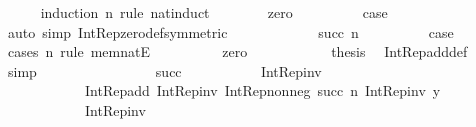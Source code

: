 \begin{isabellebody}
\ \ \ \ \isamarkupfalse%
\ {\isacharparenleft}{\kern0pt}induction\ n\ rule{\isacharcolon}{\kern0pt}\ nat{\isacharunderscore}{\kern0pt}induct{\isacharparenright}{\kern0pt}\isanewline
\ \ \ \ \ \ \isamarkupfalse%
\ zero\isanewline
\ \ \ \ \ \ \isamarkupfalse%
\ \isamarkupfalse%
\ {\isacharquery}{\kern0pt}case\ \isamarkupfalse%
\ {\isacharparenleft}{\kern0pt}auto\ simp{\isacharcolon}{\kern0pt}\ Int{\isacharunderscore}{\kern0pt}Rep{\isacharunderscore}{\kern0pt}zero{\isacharunderscore}{\kern0pt}def{\isacharbrackleft}{\kern0pt}symmetric{\isacharbrackright}{\kern0pt}{\isacharparenright}{\kern0pt}\isanewline
\ \ \ \ \isamarkupfalse%
\isanewline
\ \ \ \ \ \ \isamarkupfalse%
\ {\isacharparenleft}{\kern0pt}succ\ n{\isacharparenright}{\kern0pt}\isanewline
\ \ \ \ \ \ \isamarkupfalse%
\ \isamarkupfalse%
\ {\isacharquery}{\kern0pt}case\isanewline
\ \ \ \ \ \ \isamarkupfalse%
\ {\isacharparenleft}{\kern0pt}cases\ n\ rule{\isacharcolon}{\kern0pt}\ mem{\isacharunderscore}{\kern0pt}natE{\isacharparenright}{\kern0pt}\isanewline
\ \ \ \ \ \ \ \ \isamarkupfalse%
\ zero\isanewline
\ \ \ \ \ \ \ \ \isamarkupfalse%
\ \isamarkupfalse%
\ {\isacharquery}{\kern0pt}thesis\ \isamarkupfalse%
\ Int{\isacharunderscore}{\kern0pt}Rep{\isacharunderscore}{\kern0pt}add{\isacharunderscore}{\kern0pt}def\ \isamarkupfalse%
\ simp\isanewline
\ \ \ \ \ \ \isamarkupfalse%
\isanewline
\ \ \ \ \ \ \ \ \isamarkupfalse%
\ {\isacharparenleft}{\kern0pt}succ\ {\isacharunderscore}{\kern0pt}{\isacharparenright}{\kern0pt}\isanewline
\ \ \ \ \ \ \ \ \isamarkupfalse%
\ {\isachardoublequoteopen}Int{\isacharunderscore}{\kern0pt}Rep{\isacharunderscore}{\kern0pt}inv\ {\isacharparenleft}{\kern0pt}\isanewline
\ \ \ \ \ \ \ \ \ \ \ \ Int{\isacharunderscore}{\kern0pt}Rep{\isacharunderscore}{\kern0pt}add\ {\isacharparenleft}{\kern0pt}Int{\isacharunderscore}{\kern0pt}Rep{\isacharunderscore}{\kern0pt}inv\ {\isacharparenleft}{\kern0pt}Int{\isacharunderscore}{\kern0pt}Rep{\isacharunderscore}{\kern0pt}nonneg\ {\isacharparenleft}{\kern0pt}succ\ n{\isacharparenright}{\kern0pt}{\isacharparenright}{\kern0pt}{\isacharparenright}{\kern0pt}\ {\isacharparenleft}{\kern0pt}Int{\isacharunderscore}{\kern0pt}Rep{\isacharunderscore}{\kern0pt}inv\ y{\isacharparenright}{\kern0pt}\isanewline
\ \ \ \ \ \ \ \ \ \ {\isacharparenright}{\kern0pt}\ {\isacharequal}{\kern0pt}\ Int{\isacharunderscore}{\kern0pt}Rep{\isacharunderscore}{\kern0pt}inv\ {\isacharparenleft}{\kern0pt}\isanewline

\end{isabellebody}
